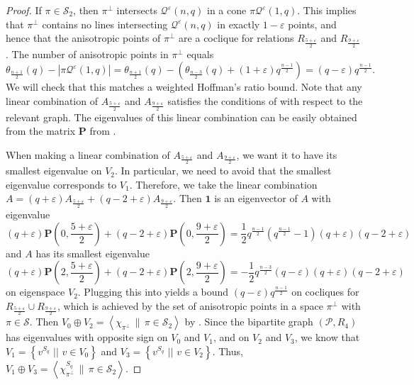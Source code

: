 \documentclass[10pt,a4paper]{amsart}
\newcommand{\eps}{\varepsilon}
\newcommand{\mq}{\mathcal Q}
\newcommand{\ms}{\mathcal S}
\newcommand{\one}{\mathbf 1}
\newcommand{\pp}{\mathcal P}
\newcommand{\sett}[2]{ \left\{ #1 \, \, || \, \, #2 \right \} }
\newcommand{\vspann}[2]{\left \langle #1 \, \| \, #2 \right \rangle}
\begin{document}
\begin{proof}
 If $\pi \in \ms_2$, then $\pi^\perp$ intersects $\mq^\eps(n,q)$ in a cone $\pi \mq^\eps(1,q)$.
 This implies that $\pi^\perp$ contains no lines intersecting $\mq^\eps(n,q)$ in exactly $1-\eps$ points, and hence that the anisotropic points of $\pi^\perp$ are a coclique for relations $R_{\frac{5+\eps}2}$ and $R_{\frac{9+\eps}{2}}$.
 The number of anisotropic points in $\pi^\perp$ equals
 \[
  \theta_{\frac{n+1}2}(q) - |\pi \mq^\eps(1,q)|
  = \theta_{\frac{n+1}2}(q) - \left( \theta_{\frac{n-3}2}(q) + (1+\eps) q^\frac{n-1}2 \right)
  = (q-\eps) q^\frac{n-1}2.
 \]
 We will check that this matches a weighted Hoffman's ratio bound.
 Note that any linear combination of $A_{\frac{5+\eps}2}$ and $A_{\frac{9+\eps}2}$ satisfies the conditions of  with respect to the relevant graph.
 The eigenvalues of this linear combination can be easily obtained from the matrix $\mathbf P$ from .

 When making a linear combination of $A_{\frac{5+\eps}2}$ and $A_{\frac{9+\eps}2}$, we want it to have its smallest eigenvalue on $V_2$.
 In particular, we need to avoid that the smallest eigenvalue corresponds to $V_1$.
 Therefore, we take the linear combination $A = (q+\eps) A_{\frac{5+\eps}2} + (q-2+\eps) A_{\frac{9+\eps}2}$.
 Then $\one$ is an eigenvector of $A$ with eigenvalue
 \[
  (q+\eps) \mathbf P\left(0,\frac{5+\eps}2\right) + (q-2+\eps) \mathbf P\left(0,\frac{9+\eps}2\right)
  = \frac 12 q^\frac{n-1}2 \left( q^\frac{n-1}2 - 1 \right) (q+\eps) (q-2+\eps)
 \]
 and $A$ has its smallest eigenvalue
 \[
  (q+\eps) \mathbf P\left(2,\frac{5+\eps}2\right) + (q-2+\eps) \mathbf P\left(2,\frac{9+\eps}2\right)
  = - \frac 12 q^\frac{n-3}2 (q-\eps) (q+\eps) (q-2+\eps)
 \]
 on eigenspace $V_2$.
 Plugging this into  yields a bound $(q-\eps) q^\frac{n-1}2$ on cocliques for $R_{\frac{5+\eps}2} \cup R_{\frac{9+\eps}2}$, which is achieved by the set of anisotropic points in a space $\pi^\perp$ with $\pi \in \ms$.
 Then $V_0 \oplus V_2 = \vspann{\chi_{\pi^\perp}}{\pi \in \ms_2}$ by .
 Since the bipartite graph $(\pp,R_4)$ has eigenvalues with opposite sign on $V_0$ and $V_1$, and on $V_2$ and $V_3$, we know that $V_1 = \sett{v^{S_q}}{v \in V_0}$ and $V_3 = \sett{v^{S_q}}{v \in V_2}$.
 Thus, $V_1 \oplus V_3 = \vspann{\chi_{\pi^\perp}^{S_q}}{\pi \in \ms_2}$.
\end{proof}
\end{document}
